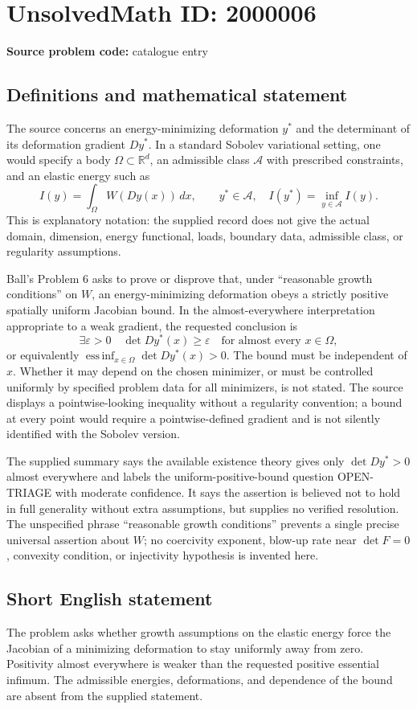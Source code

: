 \documentclass[11pt]{article}
\newcommand{\R}{\mathbb{R}}
\begin{document}
\section*{UnsolvedMath ID: 2000006}
\textbf{Source problem code:} catalogue entry
\subsection{Definitions and mathematical statement}
The source concerns an energy-minimizing deformation $y^*$ and the determinant of its deformation gradient $Dy^*$. In a standard Sobolev variational setting, one would specify a body $\Omega\subset\R^d$, an admissible class $\mathcal A$ with prescribed constraints, and an elastic energy such as
\[
I(y)=\int_\Omega W(Dy(x))\,dx,
\qquad y^*\in\mathcal A,\quad I(y^*)=\inf_{y\in\mathcal A}I(y).
\]
This is explanatory notation: the supplied record does not give the actual domain, dimension, energy functional, loads, boundary data, admissible class, or regularity assumptions.

Ball's Problem 6 asks to prove or disprove that, under ``reasonable growth conditions'' on $W$, an energy-minimizing deformation obeys a strictly positive spatially uniform Jacobian bound. In the almost-everywhere interpretation appropriate to a weak gradient, the requested conclusion is
\[
\exists\varepsilon>0\quad
\det Dy^*(x)\geq\varepsilon
\quad\text{for almost every }x\in\Omega,
\]
or equivalently $\operatorname*{ess\,inf}_{x\in\Omega}\det Dy^*(x)>0$. The bound must be independent of $x$. Whether it may depend on the chosen minimizer, or must be controlled uniformly by specified problem data for all minimizers, is not stated. The source displays a pointwise-looking inequality without a regularity convention; a bound at every point would require a pointwise-defined gradient and is not silently identified with the Sobolev version.

The supplied summary says the available existence theory gives only $\det Dy^*>0$ almost everywhere and labels the uniform-positive-bound question OPEN-TRIAGE with moderate confidence. It says the assertion is believed not to hold in full generality without extra assumptions, but supplies no verified resolution. The unspecified phrase ``reasonable growth conditions'' prevents a single precise universal assertion about $W$; no coercivity exponent, blow-up rate near $\det F=0$, convexity condition, or injectivity hypothesis is invented here.
\subsection{Short English statement}
The problem asks whether growth assumptions on the elastic energy force the Jacobian of a minimizing deformation to stay uniformly away from zero. Positivity almost everywhere is weaker than the requested positive essential infimum. The admissible energies, deformations, and dependence of the bound are absent from the supplied statement.
\end{document}
